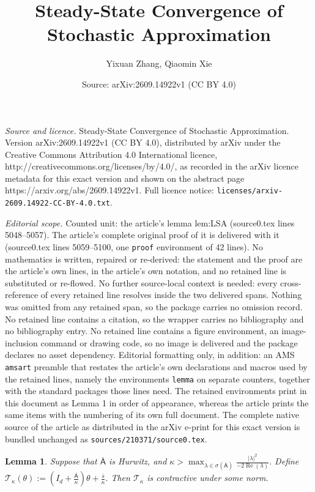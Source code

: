 \documentclass[10pt,a4paper]{amsart}
\title{Steady-State Convergence of Stochastic Approximation}
\author{Yixuan Zhang, Qiaomin Xie}
\date{Source: arXiv:2609.14922v1 (CC BY 4.0)}
\newtheorem{lemma}{Lemma}
\newcommand{\mT}{\mathcal{T}}
\begin{document}
\maketitle

\noindent\emph{Source and licence.} Steady-State Convergence of Stochastic Approximation. Version arXiv:2609.14922v1 (CC BY 4.0), distributed by arXiv under the Creative Commons Attribution 4.0 International licence, http://creativecommons.org/licenses/by/4.0/, as recorded in the arXiv licence metadata for this exact version and shown on the abstract page https://arxiv.org/abs/2609.14922v1. Full licence notice: \texttt{licenses/arxiv-2609.14922-CC-BY-4.0.txt}.\par\smallskip

\noindent\textit{Editorial scope.} Counted unit: the article's lemma lem:LSA (source0.tex lines 5048--5057). The article's complete original proof of it is delivered with it (source0.tex lines 5059--5100, one \texttt{proof} environment of 42 lines). No mathematics is written, repaired or re-derived: the statement and the proof are the article's own lines, in the article's own notation, and no retained line is substituted or re-flowed.  No further source-local context is needed: every cross-reference of every retained line resolves inside the two delivered spans.  Nothing was omitted from any retained span, so the package carries no omission record.  No retained line contains a citation, so the wrapper carries no bibliography and no bibliography entry.  No retained line contains a figure environment, an image-inclusion command or drawing code, so no image is delivered and the package declares no asset dependency.  Editorial formatting only, in addition: an AMS \texttt{amsart} preamble that restates the article's own declarations and macros used by the retained lines, namely the environments \texttt{lemma} on separate counters, together with the standard packages those lines need.  The retained environments print in this document as Lemma 1 in order of appearance, whereas the article prints the same items with the numbering of its own full document.  The complete native source of the article as distributed in the arXiv e-print for this exact version is bundled unchanged as \texttt{sources/210371/source0.tex}.
\begin{lemma}
\label{lem:LSA}
Suppose that \(\overline{\mathsf A}\) is Hurwitz, and $\kappa
    >
    \max_{\lambda\in\sigma(\overline{\mathsf A})}
    \frac{|\lambda|^2}{-2\operatorname{Re}(\lambda)}.$ Define $\mT_\kappa(\theta)
    :=
    \left(I_d+\frac{\overline{\mathsf A}}{\kappa}\right)\theta
    +\frac{\overline s}{\kappa}.$ Then \(\mT_\kappa\) is contractive under some norm.
\end{lemma}
\end{document}
